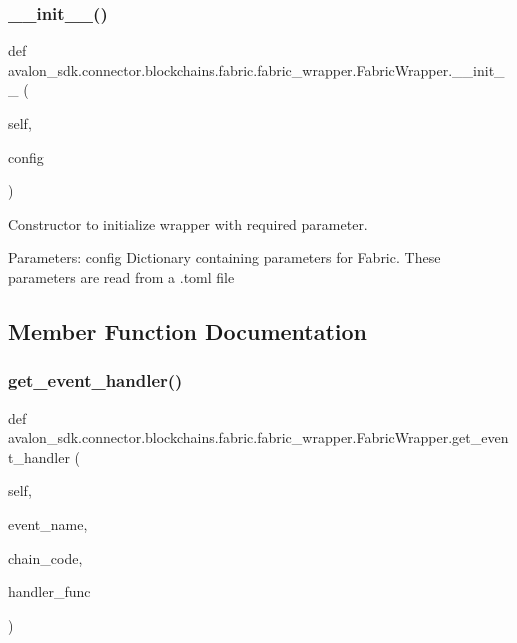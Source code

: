 \subsubsection{\texorpdfstring{\+\_\+\+\_\+init\+\_\+\+\_\+()}{\_\_init\_\_()}}
{\footnotesize\ttfamily def avalon\+\_\+sdk.\+connector.\+blockchains.\+fabric.\+fabric\+\_\+wrapper.\+Fabric\+Wrapper.\+\_\+\+\_\+init\+\_\+\+\_\+ (\begin{DoxyParamCaption}\item[{}]{self,  }\item[{}]{config }\end{DoxyParamCaption})}

\begin{DoxyVerb}Constructor to initialize wrapper with required parameter.

Parameters:
config    Dictionary containing parameters for Fabric.
  These parameters are read from a .toml file
\end{DoxyVerb}
 

\subsection{Member Function Documentation}
\mbox{\label{classavalon__sdk_1_1connector_1_1blockchains_1_1fabric_1_1fabric__wrapper_1_1FabricWrapper_a69bdaf137351a40465f1b4ab8e506554}} 
\subsubsection{\texorpdfstring{get\+\_\+event\+\_\+handler()}{get\_event\_handler()}}
{\footnotesize\ttfamily def avalon\+\_\+sdk.\+connector.\+blockchains.\+fabric.\+fabric\+\_\+wrapper.\+Fabric\+Wrapper.\+get\+\_\+event\+\_\+handler (\begin{DoxyParamCaption}\item[{}]{self,  }\item[{}]{event\+\_\+name,  }\item[{}]{chain\+\_\+code,  }\item[{}]{handler\+\_\+func }\end{DoxyParamCaption})}

